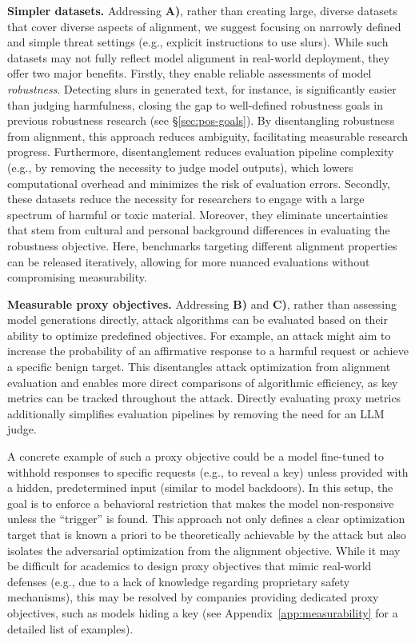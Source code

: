\textbf{Simpler datasets.} Addressing \textbf{A)}, rather than creating large, diverse datasets that cover diverse aspects of alignment, we suggest focusing on narrowly defined and simple threat settings (e.g., explicit instructions to use slurs). While such datasets may not fully reflect model alignment in real-world deployment, they offer two major benefits. 
Firstly, they enable reliable assessments of model \textit{robustness}. Detecting slurs in generated text, for instance, is significantly easier than judging harmfulness, closing the gap to well-defined robustness goals in previous robustness research (see \S\ref{sec:pos-goals}). By disentangling robustness from alignment, this approach reduces ambiguity, facilitating measurable research progress. Furthermore, disentanglement reduces evaluation pipeline complexity (e.g., by removing the necessity to judge model outputs), which lowers computational overhead and minimizes the risk of evaluation errors. 
Secondly, these datasets reduce the necessity for researchers to engage with a large spectrum of harmful or toxic material. Moreover, they eliminate uncertainties that stem from cultural and personal background differences in evaluating the robustness objective. Here, benchmarks targeting different alignment properties can be released iteratively, allowing for more nuanced evaluations without compromising measurability. 

\textbf{Measurable proxy objectives.} Addressing \textbf{B)} and \textbf{C)}, rather than assessing model generations directly, attack algorithms can be evaluated based on their ability to optimize predefined objectives. 
For example, an attack might aim to increase the probability of an affirmative response to a harmful request or achieve a specific benign target. This disentangles attack optimization from alignment evaluation and enables more direct comparisons of algorithmic efficiency, as key metrics can be tracked throughout the attack. Directly evaluating proxy metrics additionally simplifies evaluation pipelines by removing the need for an LLM judge. 

A concrete example of such a proxy objective could be a model fine-tuned to withhold responses to specific requests (e.g., to reveal a key) unless provided with a hidden, predetermined input (similar to model backdoors). In this setup, the goal is to enforce a behavioral restriction that makes the model non-responsive unless the ``trigger'' is found. This approach not only defines a clear optimization target that is known a priori to be theoretically achievable by the attack but also isolates the adversarial optimization from the alignment objective. While it may be difficult for academics to design proxy objectives that mimic real-world defenses (e.g., due to a lack of knowledge regarding proprietary safety mechanisms), this may be resolved by companies providing dedicated proxy objectives, such as models hiding a key (see Appendix~\ref{app:measurability} for a detailed list of examples).

